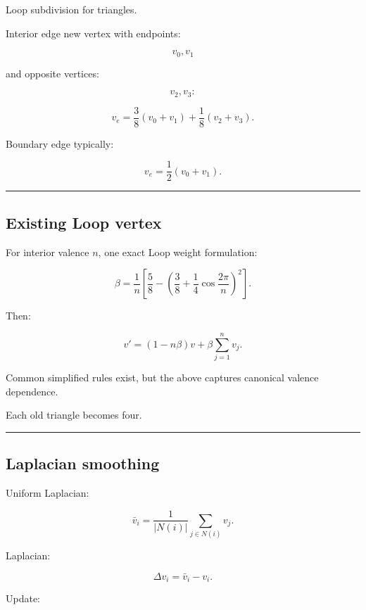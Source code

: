 Loop subdivision for triangles.

Interior edge new vertex with endpoints:

\[
v_0,v_1
\]

and opposite vertices:

\[
v_2,v_3:
\]

\[
\boxed{
v_e
=
\frac38(v_0+v_1)
+
\frac18(v_2+v_3).
}
\]

Boundary edge typically:

\[
v_e=
\frac12(v_0+v_1).
\]

\begin{center}\rule{0.5\linewidth}{0.5pt}\end{center}

\subsection{Existing Loop vertex}\label{04-visual-computing-ii-ch041-existing-loop-vertex}

\hypertarget{04-visual-computing-ii-ch041-existing-loop-vertex}{}

For interior valence \(n\), one exact Loop weight formulation:

\[
\beta
=
\frac1n
\left[
\frac58-
\left(
\frac38+
\frac14\cos\frac{2\pi}{n}
\right)^2
\right].
\]

Then:

\[
\boxed{
v'
=
(1-n\beta)v
+
\beta
\sum_{j=1}^{n}v_j.
}
\]

Common simplified rules exist, but the above captures canonical valence dependence.

Each old triangle becomes four.

\begin{center}\rule{0.5\linewidth}{0.5pt}\end{center}

\subsection{Laplacian smoothing}\label{04-visual-computing-ii-ch041-laplacian-smoothing}

\hypertarget{04-visual-computing-ii-ch041-laplacian-smoothing}{}

Uniform Laplacian:

\[
\bar v_i=
\frac1{|N(i)|}
\sum_{j\in N(i)}
v_j.
\]

Laplacian:

\[
\Delta v_i=
\bar v_i-v_i.
\]

Update:

